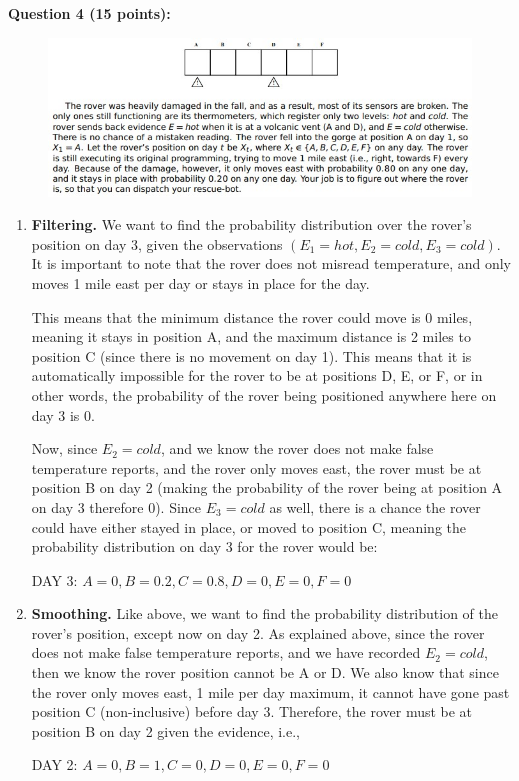 \documentclass[12pt]{article}
\begin{document}
\textbf{Question 4 (15 points):}

\begin{figure}[h]
    \centering
    \includegraphics{images/probdescrips/prob4.jpg}
	\caption{}
	\label{fig:prob4}
\end{figure}

\begin{enumerate}[label=(\alph*)]
    \item \textbf{Filtering.} We want to find the probability distribution over the rover's position on day 3, given the observations $(E_1 = hot, E_2 = cold, E_3 = cold)$. It is important to note that the rover does not misread temperature, and only moves 1 mile east per day or stays in place for the day. 
    
    This means that the minimum distance the rover could move is 0 miles, meaning it stays in position A, and the maximum distance is 2 miles to position C (since there is no movement on day 1). This means that it is automatically impossible for the rover to be at positions D, E, or F, or in other words, the probability of the rover being positioned anywhere here on day 3 is 0.

    Now, since $E_2 = cold$, and we know the rover does not make false temperature reports, and the rover only moves east, the rover must be at position B on day 2 (making the probability of the rover being at position A on day 3 therefore 0). Since $E_3 = cold$ as well, there is a chance the rover could have either stayed in place, or moved to position C, meaning the probability distribution on day 3 for the rover would be:
    \begin{center}
        DAY 3: $A = 0, B = 0.2, C = 0.8, D = 0, E = 0, F = 0$
    \end{center}
    
    \item \textbf{Smoothing.} Like above, we want to find the probability distribution of the rover's position, except now on day 2. As explained above, since the rover does not make false temperature reports, and we have recorded $E_2 = cold$, then we know the rover position cannot be A or D. We also know that since the rover only moves east, 1 mile per day maximum, it cannot have gone past position C (non-inclusive) before day 3. Therefore, the rover must be at position B on day 2 given the evidence, i.e.,
    \begin{center}
        DAY 2: $A = 0, B = 1, C = 0, D = 0, E = 0, F = 0$
    \end{center}
    

\end{enumerate}
\end{document}
